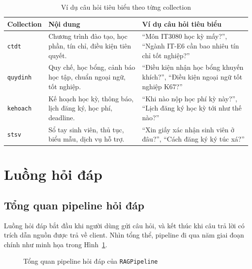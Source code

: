 \documentclass[../DoAn.tex]{subfiles}
\begin{document}
\begin{table}[H]
\centering
\begin{tabular}{|p{2.4cm}|p{3.8cm}|p{6.2cm}|}
\hline
\textbf{Collection} & \textbf{Nội dung} & \textbf{Ví dụ câu hỏi tiêu biểu} \\
\hline
\texttt{ctdt} & Chương trình đào tạo, học phần, tín chỉ, điều kiện tiên quyết.
& ``Môn IT3080 học kỳ mấy?'', ``Ngành IT-E6 cần bao nhiêu tín chỉ tốt nghiệp?'' \\
\hline
\texttt{quydinh} & Quy chế, học bổng, cảnh báo học tập, chuẩn ngoại ngữ, tốt
nghiệp. & ``Điều kiện nhận học bổng khuyến khích?'', ``Điều kiện ngoại ngữ tốt
nghiệp K67?'' \\
\hline
\texttt{kehoach} & Kế hoạch học kỳ, thông báo, lịch đăng ký, học phí, deadline.
& ``Khi nào nộp học phí kỳ này?'', ``Lịch đăng ký học kỳ tới như thế nào?'' \\
\hline
\texttt{stsv} & Sổ tay sinh viên, thủ tục, biểu mẫu, dịch vụ hỗ trợ. &
``Xin giấy xác nhận sinh viên ở đâu?'', ``Cách đăng ký ký túc xá?'' \\
\hline
\end{tabular}
\caption{Ví dụ câu hỏi tiêu biểu theo từng collection}
\label{tab:chapter3-collections}
\end{table}

\section{Luồng hỏi đáp}

\subsection{Tổng quan pipeline hỏi đáp}

Luồng hỏi đáp bắt đầu khi người dùng gửi câu hỏi, và kết thúc khi câu trả lời
có trích dẫn nguồn được trả về client. Nhìn tổng thể, pipeline đi qua năm giai
đoạn chính như minh họa trong Hình~\ref{fig:chapter3-rag-pipeline}.

\begin{figure}[H]
    \centering
    \caption{Tổng quan pipeline hỏi đáp của \texttt{RAGPipeline}}
    \label{fig:chapter3-rag-pipeline}
\end{figure}
\end{document}
